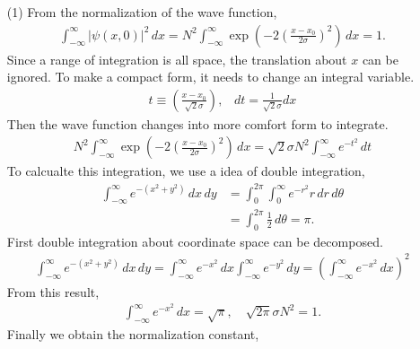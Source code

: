 \documentclass[floatfix,nofootinbib,superscriptaddress,fleqn]{revtex4}
\begin{document}
\begin{itemize}
  \item[(1)] From the normalization of the wave function,
  \begin{align}
    \int_{-\infty}^{\infty} |\psi(x,0)|^2\,dx=N^2\int_{-\infty}^{\infty}\exp\left(-2{\left(\frac{x-x_0}{2\sigma}\right)}^2\right) \,dx =1.
  \end{align}
Since a range of integration is all space, the translation about $x$ can be ignored.
To make a compact form, it needs to change an integral variable.
  \begin{align}
    t \equiv \left(\frac{x-x_0}{\sqrt{2}\sigma}\right),\;\;\; dt = \frac{1}{\sqrt{2}\sigma} dx 
  \end{align}
Then the wave function changes into more comfort form to integrate.
  \begin{align}
    N^2\int_{-\infty}^{\infty}\exp\left(-2{\left(\frac{x-x_0}{2\sigma}\right)}^2\right) \,dx
    =\sqrt{2}\sigma N^2\int_{-\infty}^{\infty} e^{-t^2} \,dt
  \end{align}
To calcualte this integration, we use a idea of double integration,
  \begin{align}
    \int_{-\infty}^{\infty} e^{-(x^2+y^2)}\,dx\,dy &= \int_{0}^{2\pi}\int_{0}^{\infty} e^{-r^2}r\,dr\,d\theta
    \\   &= \int_{0}^{2\pi}\frac{1}{2}\,d\theta = \pi.
  \end{align}
First double integration about coordinate space can be decomposed.
  \begin{align}
    \int_{-\infty}^{\infty} e^{-(x^2+y^2)}\,dx\,dy 
    = \int_{-\infty}^{\infty} e^{-x^2}\,dx\int_{-\infty}^{\infty}e^{-y^2}\,dy
    = \left(\int_{-\infty}^{\infty} e^{-x^2}\,dx\right)^2
  \end{align}
From this result,
  \begin{align}
    \int_{-\infty}^{\infty} e^{-x^2} \,dx = \sqrt{\pi},\quad \sqrt{2\pi}\sigma N^2 =1.
  \end{align}
Finally we obtain the normalization constant,
  \begin{align}

\end{align}
\end{itemize}
\end{document}
